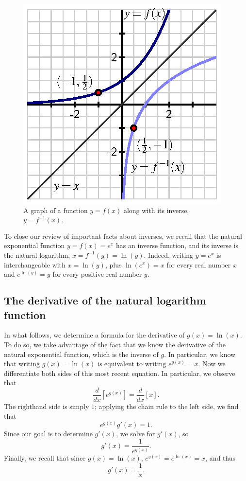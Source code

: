 \begin{figure}[h]
\begin{center}
\includegraphics{figures/2_6_InversePlot.eps}
\caption{A graph of a function $y = f(x)$ along with its inverse, $y = f^{-1}(x)$.} \label{F:2.6.InversePlot}
\end{center}
\end{figure}

To close our review of important facts about inverses, we recall that the natural exponential function $y = f(x) = e^x$ has an inverse function, and its inverse is the natural logarithm, $x = f^{-1}(y) = \ln(y)$.  Indeed, writing $y = e^x$ is interchangeable with $x = \ln(y)$, plus
$\ln(e^x) = x$ for every real number $x$ and $e^{\ln(y)} = y$ for every positive real number $y.$

\subsection*{The derivative of the natural logarithm function}

In what follows, we determine a formula for the derivative of $g(x) = \ln(x)$.  To do so, we take advantage of the fact that we know the derivative of the natural exponential function, which is the inverse of $g$.  In particular, we know that writing $g(x) = \ln(x)$ is equivalent to writing $e^{g(x)} = x$.  Now we differentiate both sides of this most recent equation.  In particular, we observe that
$$\frac{d}{dx}\left[e^{g(x)}\right] = \frac{d}{dx}[x].$$
The righthand side is simply $1$; applying the chain rule to the left side, we find that
$$e^{g(x)} g'(x) = 1.$$
Since our goal is to determine $g'(x)$, we solve for $g'(x)$, so 
$$g'(x) = \frac{1}{e^{g(x)}}.$$
Finally, we recall that since $g(x) = \ln(x)$, $e^{g(x)} = e^{\ln(x)} = x$, and thus
$$g'(x) = \frac{1}{x}.$$

